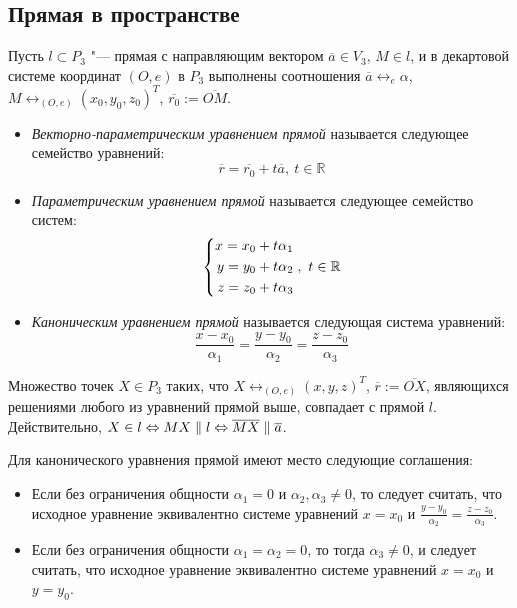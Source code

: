 \subsection{Прямая в пространстве}

\begin{definition}
	Пусть $l \subset P_3$ "--- прямая с направляющим вектором $\overline{a} \in V_3$, $M \in l$, и в декартовой системе координат $(O, e)$ в $P_3$ выполнены соотношения $\overline{a} \leftrightarrow_{e} \alpha$, $M \leftrightarrow_{(O, e)} (x_0, y_0, z_0)^T$, $\overline{r_0} := \overline{OM}$.
	\begin{itemize}
		\item \textit{Векторно-параметрическим уравнением прямой} называется следующее семейство уравнений:
		\[\overline{r} = \overline{r_0} + t\overline{a},~t \in \mathbb{R}\]
		
		\item \textit{Параметрическим уравнением прямой} называется следующее семейство систем:
		\[\left\{
		\begin{aligned}
			x = x_0 + t\alpha_1\\
			y = y_0 + t\alpha_2\\
			z = z_0 + t\alpha_3
		\end{aligned}
		\right.,~t \in \mathbb{R}
		\]
		\item \textit{Каноническим уравнением прямой} называется следующая система уравнений:
		\[\frac{x - x_0}{\alpha_1} = \frac{y - y_0}{\alpha_2} = \frac{z - z_0}{\alpha_3}\]
	\end{itemize}
\end{definition}

\begin{note}
	Множество точек $X \in P_3$ таких, что $X \leftrightarrow_{(O, e)} (x, y, z)^T$, $\overline{r} := \overline{OX}$, являющихся решениями любого из уравнений прямой выше, совпадает с прямой $l$. Действительно, $X \in l \Leftrightarrow MX \parallel l \Leftrightarrow \overline{MX} \parallel \overline{a}$.
\end{note}

\begin{note}
	Для канонического уравнения прямой имеют место следующие соглашения:
	\begin{itemize}
		\item Если без ограничения общности $\alpha_1 = 0$ и $\alpha_2, \alpha_3 \ne 0$, то следует считать, что исходное уравнение эквивалентно системе уравнений $x = x_0$ и $\frac{y - y_0}{\alpha_2} = \frac{z - z_0}{\alpha_3}$.
		
		\item Если без ограничения общности $\alpha_1 = \alpha_2 = 0$, то тогда $\alpha_3 \ne 0$, и следует считать, что исходное уравнение эквивалентно системе уравнений $x = x_0$ и $y = y_0$.
	\end{itemize}
\end{note}

